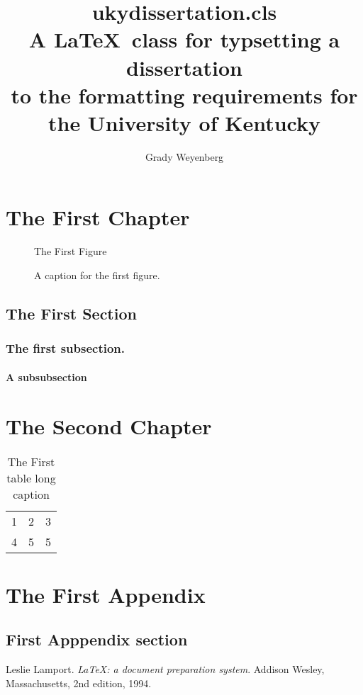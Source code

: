 \documentclass[endorse]{ukydissertation}
\title{ukydissertation.cls\protect\\%
  A \LaTeX\ class for typsetting a dissertation\protect\\%
  to the formatting requirements for\protect\\%
  the University of Kentucky%
}
\author{Grady Weyenberg}
\begin{document}
\makefrontmatter

\chapter{The First Chapter}
\label{cha:first-chapter}
\lipsum*[1]\cite{lamport94}

\begin{figure}
  \centering
  The First Figure
  \caption[A name for the ToC]{A caption for the first figure.}
  \label{fig:numberone}
\end{figure}
\section{The First Section}
\label{sec:first-section}
\lipsum[2]
\subsection{The first subsection.}
\label{sec:first-subsection}
\lipsum[3]
\subsubsection{A subsubsection}
\lipsum[4-10]
\chapter{The Second Chapter}
\label{cha:second-chapter}
\lipsum[11-15]
\begin{table}
  \centering
  \begin{tabular}{ccc}
    1&2&3\\4&5&5\\
  \end{tabular}
  \caption[The first table shortname]{The First table long caption}
  \label{tab:numberone}
\end{table}
\lipsum[16-20]
\backmatter

\chapter{The First Appendix}
\label{cha:first-appendix}
\lipsum[21-23]
\section{First Apppendix section}
\label{sec:first-appp-sect}
\lipsum[24-29]

\clearpage
{} 
% 
% 

\begin{thebibliography}{9}
  Leslie Lamport.
  \emph{\LaTeX: a document preparation system}.
  Addison Wesley, Massachusetts, 2nd edition, 1994.
\end{thebibliography}

\vita
\lipsum[30-33]
\end{document}

